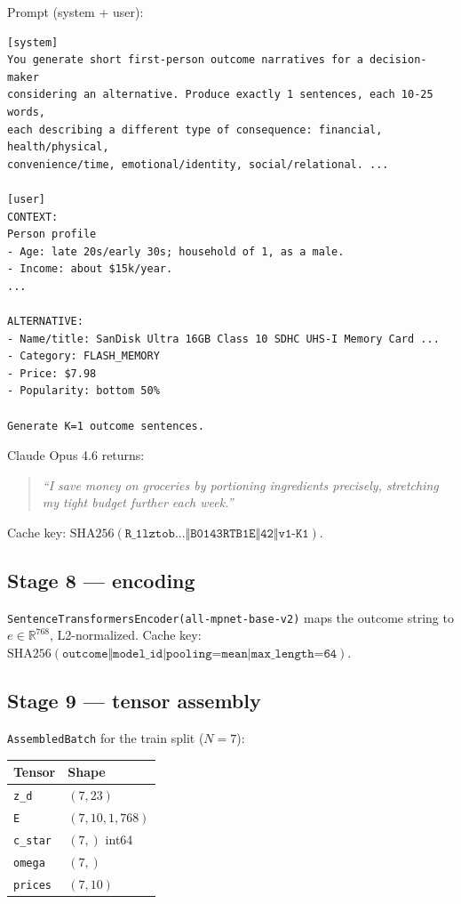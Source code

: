\documentclass[11pt,a4paper]{article}
\begin{document}
Prompt (system + user):
\begin{lstlisting}[basicstyle=\ttfamily\footnotesize]
[system]
You generate short first-person outcome narratives for a decision-maker
considering an alternative. Produce exactly 1 sentences, each 10-25 words,
each describing a different type of consequence: financial, health/physical,
convenience/time, emotional/identity, social/relational. ...

[user]
CONTEXT:
Person profile
- Age: late 20s/early 30s; household of 1, as a male.
- Income: about $15k/year.
...

ALTERNATIVE:
- Name/title: SanDisk Ultra 16GB Class 10 SDHC UHS-I Memory Card ...
- Category: FLASH_MEMORY
- Price: $7.98
- Popularity: bottom 50%

Generate K=1 outcome sentences.
\end{lstlisting}

Claude Opus 4.6 returns:
\begin{quote}
\emph{``I save money on groceries by portioning ingredients precisely, stretching my tight budget further each week.''}
\end{quote}

Cache key:
$\mathrm{SHA256}(\texttt{R\_1lztob...} \Vert \texttt{B0143RTB1E} \Vert \texttt{42} \Vert \texttt{v1-K1})$.

\subsection{Stage 8 — encoding}

\texttt{SentenceTransformersEncoder(all-mpnet-base-v2)} maps the
outcome string to $e \in \mathbb{R}^{768}$, L2-normalized. Cache key:
$\mathrm{SHA256}(\texttt{outcome} \Vert \texttt{model\_id|pooling=mean|max\_length=64})$.

\subsection{Stage 9 — tensor assembly}

\texttt{AssembledBatch} for the train split ($N = 7$):

\begin{center}
\small
\begin{tabular}{@{}l l@{}}
\toprule
Tensor & Shape \\
\midrule
\texttt{z\_d}     & $(7, 23)$ \\
\texttt{E}        & $(7, 10, 1, 768)$ \\
\texttt{c\_star}  & $(7,)$ int64 \\
\texttt{omega}    & $(7,)$ \\
\texttt{prices}   & $(7, 10)$ \\
\bottomrule
\end{tabular}
\end{center}
\end{document}
